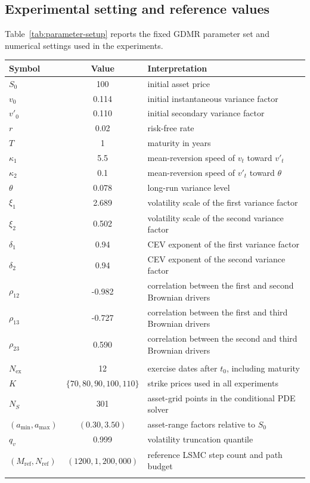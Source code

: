 \documentclass[pdflatex,sn-mathphys-num]{sn-jnl}
\makeatletter
\theoremstyle{thmstyleone}%
\theoremstyle{thmstylethree}%
\theoremstyle{thmstyletwo}%
\renewenvironment{table}[1][]{%
  \par\addvspace{12pt}%
  \noindent\begin{minipage}{\textwidth}%
  \def\@captype{table}%
  \centering%
  \tablebodyfont%
}{%
  \end{minipage}%
  \par\addvspace{12pt}%
}
\makeatother
\begin{document}
\subsection{Experimental setting and reference values}

Table~\ref{tab:parameter-setup} reports the fixed GDMR parameter set and
numerical settings used in the experiments.
\begin{table}[htbp]
\centering
\caption{Parameter set and numerical settings used in the Bermudan pricing experiments.}
\label{tab:parameter-setup}
\begin{threeparttable}
\small
\begin{tabularx}{0.94\textwidth}{@{}l c X@{}}
\toprule
Symbol & Value & Interpretation \\
\midrule
$S_0$ & 100 & initial asset price \\
$v_0$ & 0.114 & initial instantaneous variance factor \\
$v'_0$ & 0.110 & initial secondary variance factor \\
$r$ & 0.02 & risk-free rate \\
$T$ & 1 & maturity in years \\
$\kappa_1$ & 5.5 & mean-reversion speed of $v_t$ toward $v'_t$ \\
$\kappa_2$ & 0.1 & mean-reversion speed of $v'_t$ toward $\theta$ \\
$\theta$ & 0.078 & long-run variance level \\
$\xi_1$ & 2.689 & volatility scale of the first variance factor \\
$\xi_2$ & 0.502 & volatility scale of the second variance factor \\
$\delta_1$ & 0.94 & CEV exponent of the first variance factor \\
$\delta_2$ & 0.94 & CEV exponent of the second variance factor \\
$\rho_{12}$ & -0.982 & correlation between the first and second Brownian drivers \\
$\rho_{13}$ & -0.727 & correlation between the first and third Brownian drivers \\
$\rho_{23}$ & 0.590 & correlation between the second and third Brownian drivers \\
\addlinespace
\multicolumn{3}{@{}l}{\textit{Fixed numerical setting}} \\
$N_{\mathrm{ex}}$ & 12 &  exercise dates after $t_0$, including maturity \\
$K$ & $\{70,80,90,100,110\}$ & strike prices used in all experiments \\
$N_S$ & 301 & asset-grid points in the conditional PDE solver \\
$(a_{\min},a_{\max})$ & $(0.30,3.50)$ & asset-range factors relative to $S_0$ \\
$q_v$ & 0.999 & volatility truncation quantile \\
$(M_{\mathrm{ref}},N_{\mathrm{ref}})$ & $(1200,1{,}200{,}000)$ & reference LSMC step count and path budget \\
\botrule
\end{tabularx}
\end{threeparttable}
\end{table}
\end{document}
